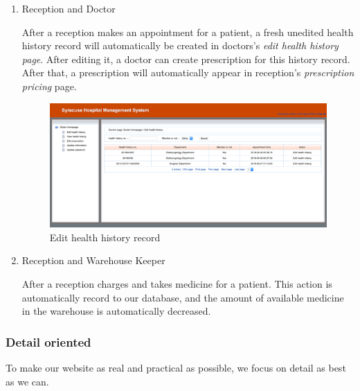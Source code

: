 \begin{enumerate}
    \item Reception and Doctor
    
    After a reception makes an appointment for a patient, a fresh unedited health  history record will automatically be created in doctors’s \emph{edit health history page}. After editing it, a doctor can create prescription for this history record. After that, a prescription will automatically appear in reception’s \emph{prescription pricing} page. 
    \begin{figure}[H]
    \centering
    \includegraphics[width=\textwidth]{fp/s3.png}
    \caption{Edit health history record}
    \label{fig:sp3}
\end{figure}
    \item Reception and Warehouse Keeper
    
    After a reception charges and takes medicine for a patient. This action is automatically record to our database, and the amount of available medicine in the warehouse is automatically decreased.
\end{enumerate}

\subsubsection{Detail oriented}
To make our website as real and practical as possible, we focus on detail as best as we can. 

